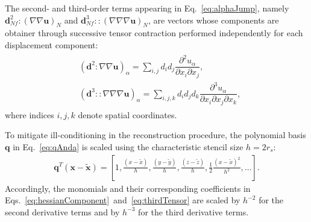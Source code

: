 \documentclass[sn-mathphys,Numbered]{sn-jnl}%
\newcommand{\bb}{\boldsymbol}
\begin{document}
\begin{appendices}
The second- and third-order terms appearing in Eq.~\eqref{eq:alphaJump}, namely $\bb{d}_{Nf}^2 \!:\! (\nabla \nabla \bb{u})_N$ and $\bb{d}_{Nf}^3 \!::\! (\nabla \nabla \nabla \bb{u})_N$, are vectors whose components are obtainer through successive tensor contraction performed independently for each displacement component:
%
\begin{eqnarray}
\begin{split}
 &\left(\bb{d}^2 \!:\! \nabla \nabla \bb{u} \right)_{\alpha} = \sum_{i,j} d_i d_j \dfrac{\partial^2 u_{\alpha}}{\partial x_i \partial x_j}, \\
 & \left(\bb{d}^3 \!::\! \nabla \nabla \nabla \bb{u} \right)_{\alpha} = \sum_{i,j,k} d_i d_j d_k \dfrac{\partial^3 u_{\alpha}}{\partial x_i \partial x_j \partial x_k},
\end{split}
\end{eqnarray}
where indices $i,j,k$ denote spatial coordinates.

To mitigate ill-conditioning in the reconstruction procedure, the polynomial basis $\mathbf{q}$ in Eq.~\eqref{eq:qAnda} is scaled using the characteristic stencil size $h = 2r_s$:
\begin{eqnarray}
\mathbf{q}^T(\bb{x}-\tilde{\bb{x}}) = \left[1, \frac{(x-\tilde{x})}{h}, \frac{(y-\tilde{y})}{h}, \frac{(z-\tilde{z})}{h}, \frac{1}{2}\frac{(x-\tilde{x})^2}{h^2}, \dots \right].
\end{eqnarray}
Accordingly, the monomials and their corresponding coefficients in Eqs.~\eqref{eq:hessianComponent}~and~\eqref{eq:thirdTensor} are scaled by $h^{-2}$ for the second derivative terms and by $h^{-3}$ for the third derivative terms.
%
%
%

\end{appendices}
\end{document}
